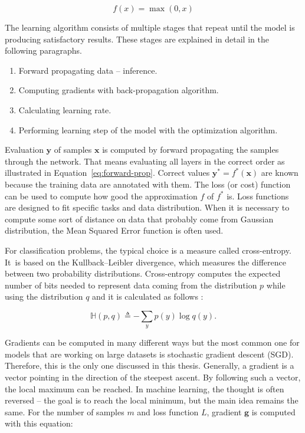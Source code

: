 \begin{equation}
    \label{eq:relu}
    f(x) = \max(0, x)
\end{equation}

The learning algorithm consists of multiple stages that repeat until the model is producing satisfactory results. These stages are explained in detail in the following paragraphs.

\begin{enumerate}
    \item Forward propagating data -- inference.
    \item Computing gradients with back-propagation algorithm.
    \item Calculating learning rate.
    \item Performing learning step of the model with the optimization algorithm.
\end{enumerate}

Evaluation $\pmb y$ of samples $\pmb x$ is computed by forward propagating the samples through the network. That means evaluating all layers in the correct order as illustrated in Equation~\ref{eq:forward-prop}. Correct values $\pmb y^*=f^*(\pmb x)$ are known because the training data are annotated with them. The loss (or cost) function can be used to compute how good the approximation $f$ of $f^*$ is. Loss functions are designed to fit specific tasks and data distribution. When it is necessary to compute some sort of distance on data that probably come from Gaussian distribution, the Mean Squared Error function is often used.

For classification problems, the typical choice is a measure called cross-entropy. It~is based on the Kullback--Leibler divergence, which measures the difference between two probability distributions. Cross-entropy computes the expected number of bits needed to represent data coming from the distribution $p$ while using the distribution $q$ and it is calculated as follows \cite{pml1Book}:

\begin{equation}
    \label{eq:cross-entropy}
    \mathbb{H}(p, q) \triangleq -\sum\limits_{y} p(y) \log q(y).
\end{equation}

Gradients can be computed in many different ways but the most common one for models that are working on large datasets is stochastic gradient descent (SGD). Therefore, this is the only one discussed in this thesis. Generally, a gradient is a vector pointing in the direction of the steepest ascent. By following such a vector, the local maximum can be reached. In machine learning, the thought is often reversed -- the goal is to reach the local minimum, but the main idea remains the same. For the number of samples $m$ and loss function $L$, gradient $\pmb g$ is computed with this equation: 

